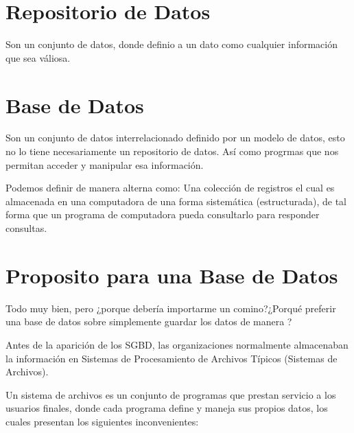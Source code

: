 \documentclass[12pt, fleqn]{report}                             %
\newcommand \Quote {\qq}                                        %
\begin{document}
        \clearpage
        \section{Repositorio de Datos}
            
            Son un conjunto de datos, donde definio a un dato como cualquier información
            que sea váliosa.




        \section{Base de Datos}

            Son un conjunto de datos interrelacionado definido por un modelo de datos, esto no lo
            tiene necesariamente un repositorio de datos. Así como progrmas que nos permitan acceder
            y manipular esa información.

            Podemos definir de manera alterna como: Una colección de registros el cual es almacenada
            en una computadora de una forma sistemática (estructurada), de tal forma que un programa
            de computadora pueda consultarlo para responder consultas.



        \section{Proposito para una Base de Datos}

            Todo muy bien, pero ¿porque debería importarme un comino?¿Porqué preferir una base de datos
            sobre simplemente guardar los datos de manera \Quote{común}?

            Antes de la aparición de los SGBD, las organizaciones normalmente almacenaban la
            información en Sistemas de Procesamiento de Archivos Típicos (Sistemas de Archivos).

            Un sistema de archivos es un conjunto de programas que prestan servicio a los usuarios
            finales, donde cada programa define y maneja sus propios datos, los cuales presentan
            los siguientes inconvenientes:
\end{document}
